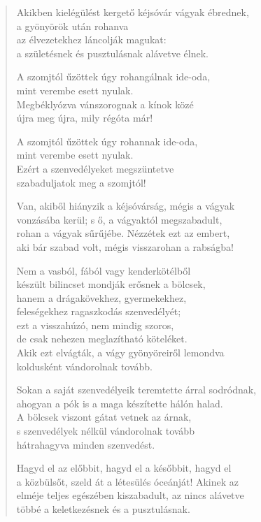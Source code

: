 \begin{verse}
 Akikben kielégülést kergető kéjsóvár vágyak ébrednek,\\
a gyönyörök után rohanva\\
az élvezetekhez láncolják magukat:\\
a születésnek és pusztulásnak alávetve élnek.

 A szomjtól űzöttek úgy rohangálnak ide-oda,\\
mint verembe esett nyulak.\\
Megbéklyózva vánszorognak a kínok közé\\
újra meg újra, mily régóta már!

 A szomjtól űzöttek úgy rohannak ide-oda,\\
mint verembe esett nyulak.\\
Ezért a szenvedélyeket megszüntetve\\
szabaduljatok meg a szomjtól!

 Van, akiből hiányzik a kéjsóvárság, mégis a vágyak\\
vonzásába kerül; s ő, a vágyaktól megszabadult,\\
rohan a vágyak sűrűjébe. Nézzétek ezt az embert,\\
aki bár szabad volt, mégis visszarohan a rabságba!

  Nem a vasból, fából vagy kenderkötélből\\
készült bilincset mondják erősnek a bölcsek,\\
hanem a drágakövekhez, gyermekekhez,\\
feleségekhez ragaszkodás szenvedélyét;\\
ezt a visszahúzó, nem mindig szoros,\\
de csak nehezen meglazítható köteléket.\\
Akik ezt elvágták, a vágy gyönyöreiről lemondva\\
koldusként vándorolnak tovább.

 Sokan a saját szenvedélyeik teremtette árral sodródnak,\\
ahogyan a pók is a maga készítette hálón halad.\\
A bölcsek viszont gátat vetnek az árnak,\\
s szenvedélyek nélkül vándorolnak tovább\\
hátrahagyva minden szenvedést.

 Hagyd el az előbbit, hagyd el a későbbit, hagyd el\\
a közbülsőt, szeld át a létesülés óceánját! Akinek az\\
elméje teljes egészében kiszabadult, az nincs alávetve\\
többé a keletkezésnek és a pusztulásnak.


\end{verse}
